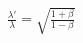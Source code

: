 

\vspace*{\fill}
\centering

\begin{align*}
    \frac{\lambda'}{\lambda} = \sqrt{\frac{1 + \beta}{1 - \beta}}
\end{align*}

\centering
\vspace*{\fill}

